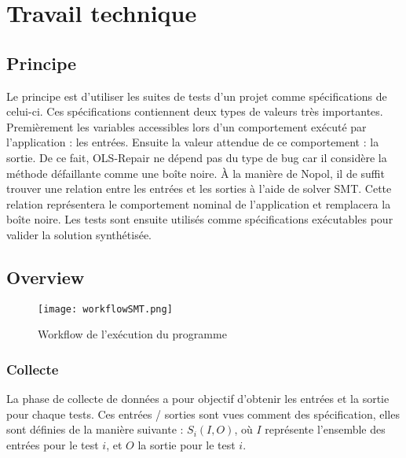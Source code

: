 

\chapter{Travail technique}
	\thispagestyle{document}
	
\section{Principe}
\label{sec:principe}
\par Le principe est d'utiliser les suites de tests d'un projet comme spécifications de celui-ci. Ces spécifications contiennent deux types de valeurs très importantes. Premièrement les variables accessibles lors d'un comportement exécuté par l'application : les entrées. Ensuite la valeur attendue de ce comportement : la sortie. De ce fait, OLS-Repair ne dépend pas du type de bug car il considère la méthode défaillante comme une boîte noire. À la manière de Nopol\cite{nopol}, il de suffit trouver une relation entre les entrées et les sorties à l'aide de solver SMT. Cette relation représentera le comportement nominal de l'application et remplacera la boîte noire. Les tests sont ensuite utilisés comme spécifications exécutables pour valider la solution synthétisée.


\section{Overview}
\label{sec:overview}
\begin{figure}[H]
\texttt{[image: workflowSMT.png]}
\caption{Workflow de l'exécution du programme}
\label{fig:workflow}
\end{figure}

\subsection{Collecte}
\label{subsec:collecte}
\par La phase de collecte de données a pour objectif d'obtenir les entrées et la sortie pour chaque tests. Ces entrées / sorties sont vues comment des spécification, elles sont définies de la manière suivante : $S_{i}(I,O)$, où $I$ représente l'ensemble des entrées pour le test $i$, et $O$ la sortie pour le test $i$. 

